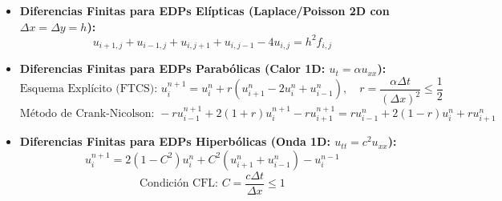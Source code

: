 \documentclass[11pt,a4paper]{article}
\begin{document}
\begin{itemize}
  \item \textbf{Diferencias Finitas para EDPs Elípticas (Laplace/Poisson 2D con $\Delta x = \Delta y = h$):}
  \[
    u_{i+1, j} + u_{i-1, j} + u_{i, j+1} + u_{i, j-1} - 4u_{i, j} = h^2 f_{i, j}
  \]
  \item \textbf{Diferencias Finitas para EDPs Parabólicas (Calor 1D: $u_t = \alpha u_{xx}$):}
  \[
    \text{Esquema Explícito (FTCS): } u_i^{n+1} = u_i^n + r(u_{i+1}^n - 2u_i^n + u_{i-1}^n), \quad r = \frac{\alpha \Delta t}{(\Delta x)^2} \le \frac{1}{2}
  \]
  \[
    \text{Método de Crank-Nicolson: } -r u_{i-1}^{n+1} + 2(1 + r)u_i^{n+1} - r u_{i+1}^{n+1} = r u_{i-1}^n + 2(1 - r)u_i^n + r u_{i+1}^n
  \]
  \item \textbf{Diferencias Finitas para EDPs Hiperbólicas (Onda 1D: $u_{tt} = c^2 u_{xx}$):}
  \[
    u_i^{n+1} = 2(1 - C^2)u_i^n + C^2(u_{i+1}^n + u_{i-1}^n) - u_i^{n-1}
  \]
  \[
    \text{Condición CFL: } C = \frac{c \Delta t}{\Delta x} \le 1
  \]
\end{itemize}
\end{document}
